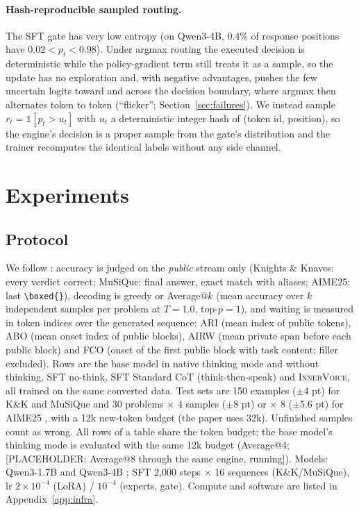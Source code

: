 \documentclass[letterpaper]{article} %
\newcommand{\placeholder}[1]{{\color{red}[PLACEHOLDER: #1]}}
\newcommand{\iv}{\textsc{InnerVoice}}
\begin{document}
\paragraph{Hash-reproducible sampled routing.} The SFT gate has very low entropy (on Qwen3-4B, 0.4\% of response positions have $0.02<p_t<0.98$). Under argmax routing the executed decision is deterministic while the policy-gradient term still treats it as a sample, so the update has no exploration and, with negative advantages, pushes the few uncertain logits toward and across the decision boundary, where argmax then alternates token to token (``flicker''; Section~\ref{sec:failures}). We instead sample $r_t=\mathbb{1}[p_t>u_t]$ with $u_t$ a deterministic integer hash of (token id, position), so the engine's decision is a proper sample from the gate's distribution and the trainer recomputes the identical labels without any side channel.

\section{Experiments}
\subsection{Protocol}
We follow \citet{wei2026sxs}: accuracy is judged on the \emph{public} stream only (Knights \& Knaves: every verdict correct; MuSiQue: final answer, exact match with aliases; AIME25: last \texttt{\textbackslash boxed\{\}}), decoding is greedy or Average@$k$ (mean accuracy over $k$ independent samples per problem at $T{=}1.0$, top-$p{=}1$), and waiting is measured in token indices over the generated sequence: ARI (mean index of public tokens), ABO (mean onset index of public blocks), AIRW (mean private span before each public block) and FCO (onset of the first public block with task content; filler excluded). Rows are the base model in native thinking mode and without thinking, SFT no-think, SFT Standard CoT (think-then-speak) and \iv{}, all trained on the same converted data. Test sets are 150 examples ($\pm$4 pt) for K\&K and MuSiQue and 30 problems $\times$ 4 samples ($\pm$8 pt) or $\times$ 8 ($\pm$5.6 pt) for AIME25 \citep{balunovic2025matharena}, with a 12k new-token budget (the paper uses 32k). Unfinished samples count as wrong. All rows of a table share the token budget; the base model's thinking mode is evaluated with the same 12k budget (Average@4; \placeholder{Average@8 through the same engine, running}). Models: Qwen3-1.7B and Qwen3-4B \citep{qwen3}; SFT 2,000 steps $\times$ 16 sequences (K\&K/MuSiQue), lr $2{\times}10^{-4}$ (LoRA) / $10^{-4}$ (experts, gate). Compute and software are listed in Appendix~\ref{app:infra}.
\end{document}
